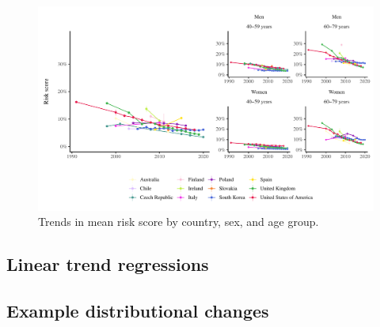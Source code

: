 \documentclass[12pt]{article}
\begin{document}
\begin{appendix}
\begin{refsection}
    \begin{figure}[hp]
        \centering
        \includegraphics[width=\textwidth]{../3_figures/risk.pdf}
        \caption{Trends in mean risk score by country, sex, and age group.}
        \label{fig:globorisk}
    \end{figure}
    

    \newpage
    \subsection{Linear trend regressions}

    \begin{landscape}
        \begin{table}
            
        \end{table}

        \begin{table}
            
        \end{table}
    \end{landscape}
    



    
    \begin{landscape}
        \subsection{Example distributional changes}


\end{landscape}
\end{refsection}
\end{appendix}
\end{document}

